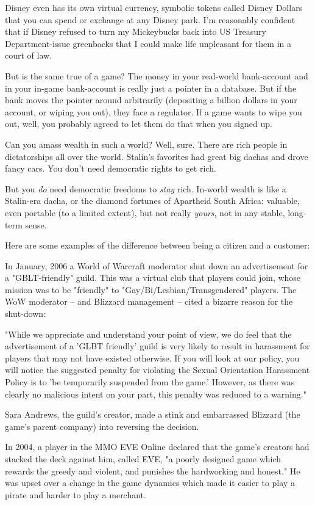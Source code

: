 Disney even has its own virtual currency, symbolic tokens called
Disney Dollars that you can spend or exchange at any Disney park.
I'm reasonably confident that if Disney refused to turn my
Mickeybucks back into US Treasury Department-issue greenbacks that
I could make life unpleasant for them in a court of law.

But is the same true of a game? The money in your real-world
bank-account and in your in-game bank-account is really just a
pointer in a database. But if the bank moves the pointer around
arbitrarily (depositing a billion dollars in your account, or
wiping you out), they face a regulator. If a game wants to wipe you
out, well, you probably agreed to let them do that when you signed
up.

Can you amass wealth in such a world? Well, sure. There are rich
people in dictatorships all over the world. Stalin's favorites had
great big dachas and drove fancy cars. You don't need democratic
rights to get rich.

But you \emph{do} need democratic freedoms to \emph{stay} rich.
In-world wealth is like a Stalin-era dacha, or the diamond fortunes
of Apartheid South Africa: valuable, even portable (to a limited
extent), but not really \emph{yours}, not in any stable,
long-term sense.

Here are some examples of the difference between being a citizen
and a customer:

In January, 2006 a World of Warcraft moderator shut down an
advertisement for a "GBLT-friendly" guild. This was a virtual club
that players could join, whose mission was to be "friendly" to
"Gay/Bi/Lesbian/Transgendered" players. The WoW moderator -- and
Blizzard management -- cited a bizarre reason for the shut-down:

"While we appreciate and understand your point of view, we do feel
that the advertisement of a 'GLBT friendly' guild is very likely to
result in harassment for players that may not have existed
otherwise. If you will look at our policy, you will notice the
suggested penalty for violating the Sexual Orientation Harassment
Policy is to 'be temporarily suspended from the game.' However, as
there was clearly no malicious intent on your part, this penalty
was reduced to a warning."

Sara Andrews, the guild's creator, made a stink and embarrassed
Blizzard (the game's parent company) into reversing the decision.

In 2004, a player in the MMO EVE Online declared that the game's
creators had stacked the deck against him, called EVE, "a poorly
designed game which rewards the greedy and violent, and punishes
the hardworking and honest." He was upset over a change in the game
dynamics which made it easier to play a pirate and harder to play a
merchant.

